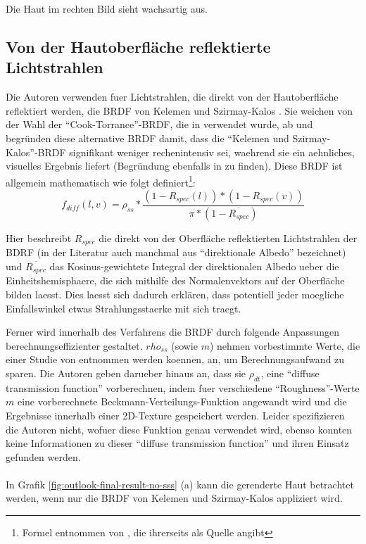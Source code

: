 \documentclass[ngerman,runningheads,a4paper]{llncs}[2018/03/10]
\begin{document}
Die Haut im rechten Bild sieht wachsartig aus.

\subsection{Von der Hautoberfläche reflektierte Lichtstrahlen}
\label{sub:skin-surface-reflect}

Die Autoren \citeauthor{efficient-human-skin-rendering} verwenden fuer Lichtstrahlen, die direkt von der Hautoberfläche reflektiert werden, die BRDF von Kelemen und Szirmay-Kalos \cite{kelemen2001microfacet}.
Sie weichen von der Wahl der \enquote{Cook-Torrance}-BRDF, die in \citet{spectral-bssrdf-human-skin} verwendet wurde, ab und begründen diese alternative BRDF damit, dass die \enquote{Kelemen und Szirmay-Kalos}-BRDF signifikant weniger rechenintensiv sei, waehrend sie ein aehnliches, visuelles Ergebnis liefert (Begründung ebenfalls in \cite{hoffman2013background} zu finden).
Diese BRDF ist allgemein mathematisch wie folgt definiert\footnote{Formel entnommen von \cite[p.~352]{real-time-rendering}, die ihrerseits \cite{kelemen2001microfacet} als Quelle angibt}: $$f_{diff}(l, v) = \rho_{ss} * \frac{(1 - R_{spec}(l))* (1 - R_{spec}(v))}{\pi * (1 - \overline{R_{spec}})}$$

Hier beschreibt $R_{spec}$ die direkt von der Oberfläche reflektierten Lichtstrahlen der BDRF (in der Literatur auch manchmal aus \enquote{direktionale Albedo} bezeichnet) und $\overline{R_{spec}}$ das Kosinus-gewichtete Integral der direktionalen Albedo ueber die Einheitshemisphaere, die sich mithilfe des Normalenvektors auf der Oberfläche bilden laesst.
Dies laesst sich dadurch erklären, dass potentiell jeder moegliche Einfallswinkel etwas Strahlungsstaerke mit sich traegt.

Ferner wird innerhalb des Verfahrens die BRDF durch folgende Anpassungen berechnungseffizienter gestaltet.
$rho_{ss}$ (sowie $m$) nehmen vorbestimmte Werte, die einer Studie von \citet{weyrich2006analysis} entnommen werden koennen, an, um Berechnungsaufwand zu sparen.
Die Autoren geben darueber hinaus an, dass sie $\rho_{dt}$, eine \enquote{diffuse transmission function} vorberechnen, indem fuer verschiedene \enquote{Roughness}-Werte $m$ eine vorberechnete Beckmann-Verteilungs-Funktion angewandt wird und die Ergebnisse innerhalb einer 2D-Texture gespeichert werden.
Leider spezifizieren die Autoren nicht, wofuer diese Funktion genau verwendet wird, ebenso konnten keine Informationen zu dieser \enquote{diffuse transmission function} und ihren Einsatz gefunden werden.
\\
\\
In Grafik \ref{fig:outlook-final-result-no-sss} (a) kann die gerenderte Haut betrachtet werden, wenn nur die BRDF von Kelemen und Szirmay-Kalos appliziert wird.
\end{document}
